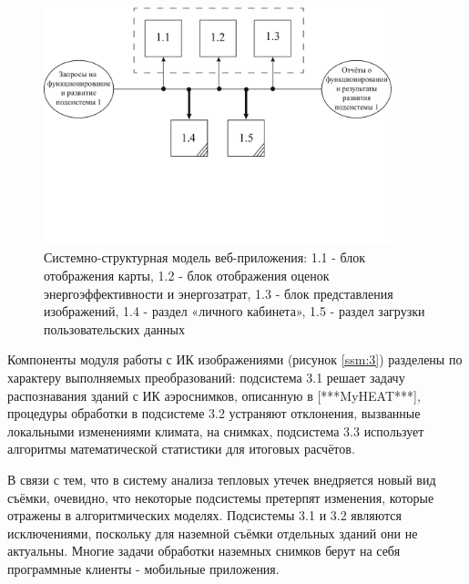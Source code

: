 	\begin{figure}[t!]
      \centering
      \includegraphics[width=0.9\textwidth]{images/ssm/1}
      \caption{Системно-структурная модель веб-приложения: 1.1 - блок отображения карты, 1.2 - блок отображения оценок энергоэффективности и энергозатрат, 1.3 - блок представления изображений, 1.4 - раздел «личного кабинета», 1.5 - раздел загрузки пользовательских данных}
      \label{ssm:1}
    \end{figure}

\par
	Компоненты модуля работы с ИК изображениями (рисунок \ref{ssm:3}) разделены по характеру выполняемых преобразований: подсистема 3.1 решает задачу распознавания зданий с ИК аэроснимков, описанную в [***MyHEAT***], процедуры обработки в подсистеме 3.2 устраняют отклонения, вызванные локальными изменениями климата, на снимках, подсистема 3.3 использует алгоритмы математической статистики для итоговых расчётов.

\pagebreak

	В связи с тем, что в систему анализа тепловых утечек внедряется новый вид съёмки, очевидно, что некоторые подсистемы претерпят изменения, которые отражены в алгоритмических моделях. Подсистемы 3.1 и 3.2 являются исключениями, поскольку для наземной съёмки отдельных зданий они не актуальны. Многие задачи обработки наземных снимков берут на себя программные клиенты - мобильные приложения.


